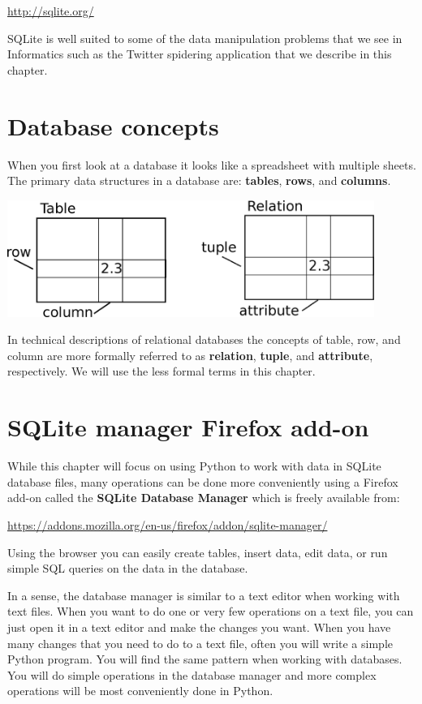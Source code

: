 \documentclass[11pt]{book}
\begin{document}
\url{http://sqlite.org/}

SQLite is well suited to some of the data manipulation problems that we 
see in Informatics such as the Twitter spidering application that we 
describe in this chapter.

\section{Database concepts}

When you first look at a database it looks like a 
spreadsheet with multiple sheets.   The primary data structures 
in a database are:
{\bf tables}, {\bf rows}, and {\bf columns}.  

\beforefig
\centerline{\includegraphics[height=1.50in]{figs2/relational.eps}}
\afterfig

In technical descriptions of relational databases the concepts of 
table, row, and column are more formally referred
to as {\bf relation}, {\bf tuple}, and {\bf attribute}, respectively.
We will use the less formal terms in this chapter.

\section{SQLite manager Firefox add-on}

While this chapter will focus on using Python to work with data 
in SQLite database files, many operations can be done more
conveniently using a Firefox add-on called the {\bf SQLite
Database Manager} which is freely available from:

\url{https://addons.mozilla.org/en-us/firefox/addon/sqlite-manager/}

Using the browser you can easily create tables, insert data, edit data, 
or run simple SQL queries on the data in the database.

In a sense, the database manager is similar to a text editor
when working with text files.   When you want to do one or
very few operations on a text file, you can just open it
in a text editor and make the changes you want.   When you have 
many changes that you need to do to a text file, often you 
will write a simple Python program.  You will find the same 
pattern when working with databases.  You will do simple
operations in the database manager and more complex operations
will be most conveniently done in Python.
\end{document}
